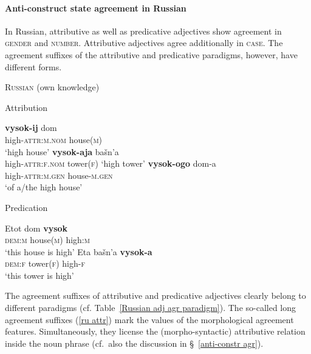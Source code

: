 \paragraph{Anti-construct state agreement in Russian} \label{russian synchr}
In Russian, attributive as well as predicative adjectives show agreement in \textsc{gender} and \textsc{number}. Attributive adjectives agree additionally in \textsc{case}. The agreement suffixes of the attributive and predicative paradigms, however, have different forms.
\begin{exe}
\ex \textsc{Russian} (own knowledge)\label{ru agr}
\begin{xlist}
\ex	Attribution \label{ru attr}
\begin{xlist}
\ex
\gll 	\textbf{vysok-ij} 		dom\\
	high-\textsc{attr:m.nom} house(\textsc{m})\\
\glt	 ‘high house’
\ex	\textbf{vysok-aja}	bašn'a\\
	high-\textsc{attr:f.nom} 	tower(\textsc{f})
\glt	‘high tower’
\ex	
\gll	\textbf{vysok-ogo}	dom-a\\
	high-\textsc{attr:m.gen}	house-\textsc{m.gen}\\
\glt	‘of a/the high house’
\end{xlist}
\ex	Predication
\begin{xlist}
\ex
\gll 	Etot 	dom	\textbf{vysok}\\
	\textsc{dem:m} house(\textsc{m}) 	high:\textsc{m}\\
\glt	 ‘this house is high’
\ex	
\gll	Eta 	bašn'a	\textbf{vysok-a}\\
	\textsc{dem:f} tower(\textsc{f}) 	high-\textsc{f}\\
\glt	‘this tower is high’
\end{xlist}
\end{xlist}
\end{exe}
The agreement suffixes of attributive and predicative adjectives clearly belong to different paradigms (cf. Table~\ref{Russian adj agr paradigm}). The so-called long agreement suffixes (\ref{ru attr}) mark the values of the morphological agreement features. Simultaneously, they license the (morpho-syntactic) attributive relation inside the noun phrase (cf.~also the discussion in \S~\ref{anti-constr agr}). 

